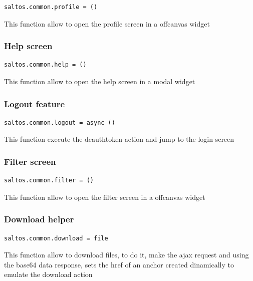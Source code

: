 \documentclass[a4paper]{article}
\begin{document}
\begin{lstlisting}
saltos.common.profile = ()
\end{lstlisting}

This function allow to open the profile screen in a offcanvas widget

\hypertarget{toc119}{}
\subsubsection{Help screen}

\begin{lstlisting}
saltos.common.help = ()
\end{lstlisting}

This function allow to open the help screen in a modal widget

\hypertarget{toc120}{}
\subsubsection{Logout feature}

\begin{lstlisting}
saltos.common.logout = async ()
\end{lstlisting}

This function execute the deauthtoken action and jump to the login screen

\hypertarget{toc121}{}
\subsubsection{Filter screen}

\begin{lstlisting}
saltos.common.filter = ()
\end{lstlisting}

This function allow to open the filter screen in a offcanvas widget

\hypertarget{toc122}{}
\subsubsection{Download helper}

\begin{lstlisting}
saltos.common.download = file
\end{lstlisting}

This function allow to download files, to do it, make the ajax request and
using the base64 data response, sets the href of an anchor created dinamically
to emulate the download action
\end{document}
